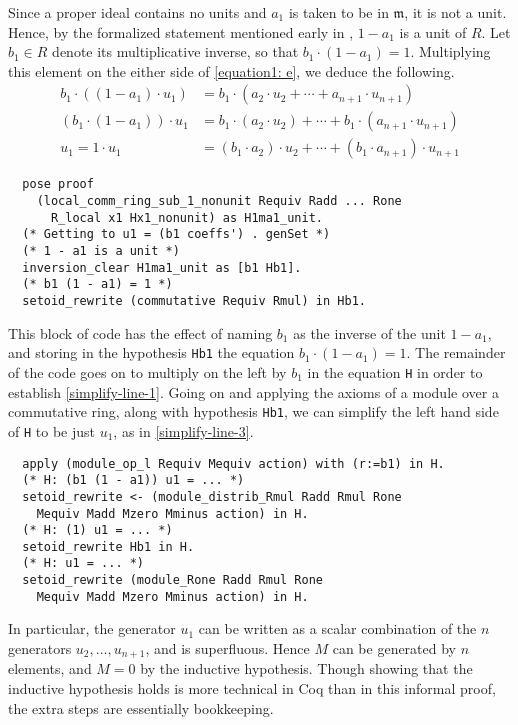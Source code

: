 \documentclass[referee,sn-mathphys]{sn-jnl}
\theoremstyle{definition}
\theoremstyle{remark}
\numberwithin{equation}{section}
\numberwithin{figure}{subsection}
\begin{document}
Since a proper ideal contains no units and $a_1$ is taken to be in
$\mathfrak{m}$, it is not a unit. Hence, by the formalized statement mentioned
early in , $1 - a_{1}$ is a unit of $R$. Let $b_{1} \in R$ denote its 
multiplicative inverse, so that $b_1 \cdot  (1 - a_{1}) = 1$. Multiplying this
element on the either side of \eqref{equation1: e}, we deduce the following.  
\begin{align}
\label{simplify-line-1}
b_1 \cdot \left((1 - a_{1}) \cdot u_{1} \right)
  & = b_1 \cdot (a_{2} \cdot u_{2} + \cdots + a_{n+1} \cdot u_{n+1}) \\ 
\label{simplify-line-2}
\left( b_1 \cdot (1 - a_{1})\right) \cdot u_{1}
  & = b_1 \cdot (a_{2} \cdot u_{2}) + \cdots + b_1 \cdot (a_{n+1} \cdot u_{n+1}) \\ 
   \label{simplify-line-3}
u_1 = 1 \cdot u_{1}
  & = (b_1 \cdot  a_{2}) \cdot u_{2} + \cdots + (b_1  \cdot  a_{n+1}) \cdot u_{n+1} 
\end{align}
\begin{verbatim}
  pose proof
    (local_comm_ring_sub_1_nonunit Requiv Radd ... Rone
      R_local x1 Hx1_nonunit) as H1ma1_unit.
  (* Getting to u1 = (b1 coeffs') . genSet *)
  (* 1 - a1 is a unit *)
  inversion_clear H1ma1_unit as [b1 Hb1].
  (* b1 (1 - a1) = 1 *)
  setoid_rewrite (commutative Requiv Rmul) in Hb1.
\end{verbatim}

This block of code has the effect of naming \(b_{1}\) as the inverse of the
unit \(1 - a_{1}\), and storing in the hypothesis \texttt{Hb1} the equation
\(b_{1} \cdot (1 - a_{1}) = 1\). The remainder of the code goes on to multiply on the
left by \(b_{1}\) in the equation \texttt{H} in order to establish  \eqref{simplify-line-1}.
Going on and applying the axioms of a module over a commutative ring, along with hypothesis \texttt{Hb1}, we can
simplify the left hand side of \texttt{H} to be just \(u_{1}\), as in \eqref{simplify-line-3}.
\begin{verbatim}
  apply (module_op_l Requiv Mequiv action) with (r:=b1) in H.
  (* H: (b1 (1 - a1)) u1 = ... *)
  setoid_rewrite <- (module_distrib_Rmul Radd Rmul Rone
    Mequiv Madd Mzero Mminus action) in H.
  (* H: (1) u1 = ... *)
  setoid_rewrite Hb1 in H.
  (* H: u1 = ... *)
  setoid_rewrite (module_Rone Radd Rmul Rone
    Mequiv Madd Mzero Mminus action) in H.
\end{verbatim}
In particular, the generator $u_1$ can be written as a scalar combination of
the $n$ generators $u_2, \ldots, u_{n+1}$, and is superfluous. Hence $M$ can be
generated by $n$ elements, and $M=0$ by the inductive hypothesis. 
Though showing that the inductive hypothesis holds is more technical in Coq than in this
informal proof, the extra steps are essentially bookkeeping.
\end{document}
